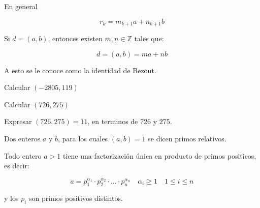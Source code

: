         En general

        \begin{equation}
            r_k = m_{k+1} a + n_{k+1} b
        \end{equation}

        \begin{teorema}
            Si $d = (a, b)$, entonces existen $m, n \in \mathbb{Z}$ tales que:

            \begin{equation}
                d = (a, b) = ma + nb
            \end{equation}

            A esto se le conoce como la identidad de Bezout.
        \end{teorema}

        \begin{ejemplo}
            Calcular $(-2805, 119)$

        \end{ejemplo}

        \begin{ejemplo}
            Calcular $(726, 275)$

        \end{ejemplo}

        \begin{ejemplo}
            Expresar $(726, 275) = 11$, en terminos de $726$ y $275$.
            
        \end{ejemplo}

        \begin{definicion}
            Dos enteros $a$ y $b$, para los cuales $(a, b) = 1$ se dicen primos relativos.
        \end{definicion}

        \begin{teorema}
            Todo entero $a > 1$ tiene una factorización única en producto de primos positicos, es decir:

            \begin{equation}
                a = p_1^{\alpha_1} \cdot p_2^{\alpha_2} \cdot \dots \cdot p_n^{\alpha_n} \quad \alpha_i \geq 1 \quad 1 \leq i \leq n
            \end{equation}

            y los $p_i$ son primos positivos distintos.
        \end{teorema}

